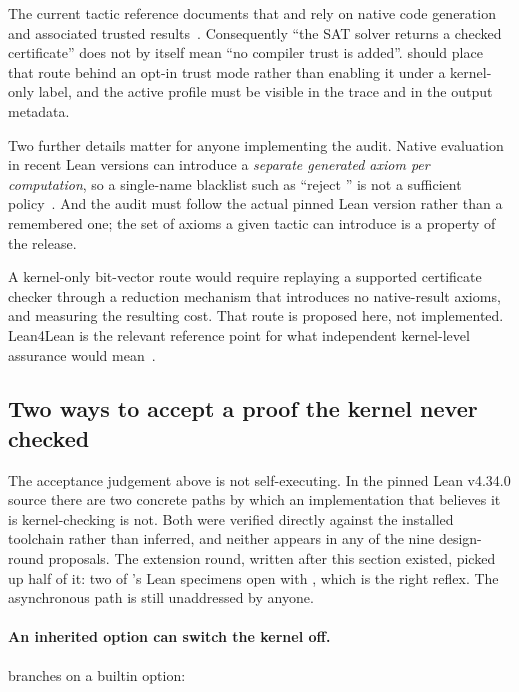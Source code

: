 The current tactic reference documents that  and
 rely on native code generation and associated trusted
results~\cite{tactic-reference,validating-proofs}. Consequently ``the SAT
solver returns a checked certificate'' does not by itself mean ``no compiler
trust is added''. \forge{} should place that route behind an opt-in trust mode
rather than enabling it under a kernel-only label, and the active profile must
be visible in the trace and in the output metadata.

Two further details matter for anyone implementing the audit. Native
evaluation in recent Lean versions can introduce a \emph{separate generated
axiom per computation}, so a single-name blacklist such as ``reject
'' is not a sufficient
policy~\cite{native-infra,native-rfc}. And the audit must follow the actual
pinned Lean version rather than a remembered one; the set of axioms a given
tactic can introduce is a property of the release.

A kernel-only bit-vector route would require replaying a supported certificate
checker through a reduction mechanism that introduces no native-result axioms,
and measuring the resulting cost. That route is proposed here, not implemented.
Lean4Lean is the relevant reference point for what independent kernel-level
assurance would mean~\cite{lean4lean}.

\subsection{Two ways to accept a proof the kernel never checked}
\label{sec:kernel-traps}

The acceptance judgement above is not self-executing. In the pinned Lean
v4.34.0 source there are two concrete paths by which an implementation that
believes it is kernel-checking is not. Both were verified directly against the
installed toolchain rather than inferred, and neither appears in any of the nine
design-round proposals. The extension round, written after this section existed,
picked up half of it: two of 's Lean specimens open with
, which is the right reflex. The
asynchronous  path is still unaddressed by anyone.

\paragraph{An inherited option can switch the kernel off.}
 branches on a builtin option:


